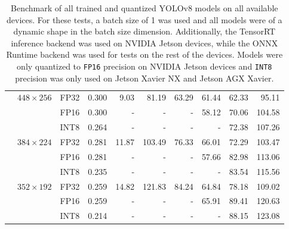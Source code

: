 \begin{appendices}
\begin{table}[h]
\begin{tabular}{|c|c|c|c|rrrrrr|}
                                                                  & \multirow{3}{*}{$448 \times 256$} & FP32 & 0.300 &  9.03 &  81.19 & 63.29 & 61.44 & 62.33 &  95.11 \\
                                                                  &                                   & FP16 & 0.300 &     - &      - &     - & 58.12 & 70.06 & 104.58 \\
                                                                  &                                   & INT8 & 0.264 &     - &      - &     - &     - & 72.38 & 107.26 \\
        \cline{2-10}
                                                                  & \multirow{3}{*}{$384 \times 224$} & FP32 & 0.281 & 11.87 & 103.49 & 76.33 & 66.01 & 72.29 & 103.47 \\
                                                                  &                                   & FP16 & 0.281 &     - &      - &     - & 57.66 & 82.98 & 113.06 \\
                                                                  &                                   & INT8 & 0.235 &     - &      - &     - &     - & 83.54 & 115.56 \\
        \cline{2-10}
                                                                  & \multirow{3}{*}{$352 \times 192$} & FP32 & 0.259 & 14.82 & 121.83 & 84.24 & 64.84 & 78.18 & 109.02 \\
                                                                  &                                   & FP16 & 0.259 &     - &      - &     - & 65.91 & 89.41 & 120.63 \\
                                                                  &                                   & INT8 & 0.214 &     - &      - &     - &     - & 88.15 & 123.08 \\
        \hline
    \end{tabular}
    \caption{Benchmark of all trained and quantized YOLOv8 models on all
    available devices. For these tests, a batch size of 1 was used and all
    models were of a dynamic shape in the batch size dimension. Additionally,
    the TensorRT inference backend was used on NVIDIA Jetson devices, while the
    ONNX Runtime backend was used for tests on the rest of the devices. Models
    were only quantized to \texttt{FP16} precision on NVIDIA Jetson devices and
    \texttt{INT8} precision was only used on Jetson Xavier NX and Jetson AGX
    Xavier.}
    \label{mAPvsFPS1}
    \normalsize
\end{table}


\end{appendices}
